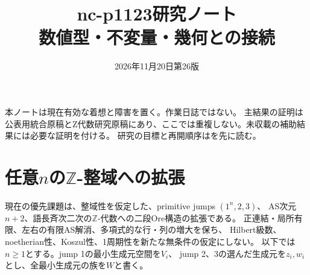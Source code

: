 \documentclass[11pt,a4paper]{ltjsarticle}
\title{nc-p1123研究ノート\\\large 数値型・不変量・幾何との接続}
\author{}
\date{2026年11月20日\quad 第26版}
\begin{document}
\maketitle
本ノートは現在有効な着想と障害を置く。作業日誌ではない。
主結果の証明は公表用統合原稿とZ代数研究原稿にあり、ここでは重複しない。未収載の補助結果には必要な証明を付ける。
研究の目標と再開順序はを先に読む。

\section{任意\texorpdfstring{$n$}{n}の\texorpdfstring{$\mathbb Z$}{Z}-整域への拡張}
\label{note:general-indexed-current}
現在の優先課題は、整域性を仮定した、primitive jumps $(1^n,2,3)$、
AS次元$n+2$、語長斉次二次の$\mathbb Z$-代数への二段Ore構造の拡張である。
正連結・局所有限、左右の有限AS解消、多項式的な行・列の増大を保ち、
Hilbert級数、noetherian性、Koszul性、1周期性を新たな無条件の仮定にしない。
以下では$n\geq1$とする。jump 1の最小生成元空間を$V_i$、
jump 2、3の選んだ生成元を$z_i,w_i$とし、全最小生成元の族を$W$と書く。
\end{document}
